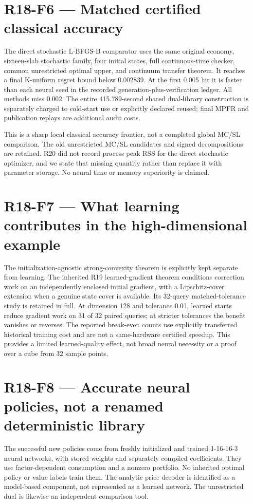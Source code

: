 \documentclass[ecta]{econsocart}
\theoremstyle{remark}
\begin{document}
\section{R18-F6 — Matched certified classical accuracy}
The direct stochastic L-BFGS-B comparator uses the same original economy, sixteen-slab stochastic family, four initial states, full continuous-time checker, common unrestricted optimal upper, and continuum transfer theorem. It reaches a final K-uniform regret bound below 0.002839. At the first 0.005 hit it is faster than each neural seed in the recorded generation-plus-verification ledger. All methods miss 0.002. The entire 415.789-second shared dual-library construction is separately charged to cold-start use or explicitly declared reused; final MPFR and publication replays are additional audit costs.

This is a sharp local classical accuracy frontier, not a completed global MC/SL comparison. The old unrestricted MC/SL candidates and signed decompositions are retained. R20 did not record process peak RSS for the direct stochastic optimizer, and we state that missing quantity rather than replace it with parameter storage. No neural time or memory superiority is claimed.

\section{R18-F7 — What learning contributes in the high-dimensional example}
The initialization-agnostic strong-convexity theorem is explicitly kept separate from learning. The inherited R19 learned-gradient theorem conditions correction work on an independently enclosed initial gradient, with a Lipschitz-cover extension when a genuine state cover is available. Its 32-query matched-tolerance study is retained in full. At dimension 128 and tolerance 0.01, learned starts reduce gradient work on 31 of 32 paired queries; at stricter tolerances the benefit vanishes or reverses. The reported break-even counts use explicitly transferred historical training cost and are not a same-hardware certified speedup. This provides a limited learned-quality effect, not broad neural necessity or a proof over a cube from 32 sample points.

\section{R18-F8 — Accurate neural policies, not a renamed deterministic library}
The successful new policies come from freshly initialized and trained 1-16-16-3 neural networks, with stored weights and separately compiled coefficients. They use factor-dependent consumption and a nonzero portfolio. No inherited optimal policy or value labels train them. The analytic price decoder is identified as a model-based component, not represented as a learned network. The unrestricted dual is likewise an independent comparison tool.
\end{document}
